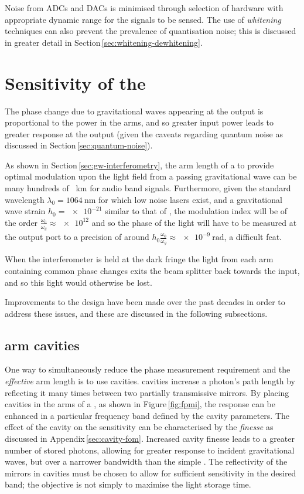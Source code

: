 Noise from \glspl{ADC} and \glspl{DAC} is minimised through selection of hardware with appropriate dynamic range for the signals to be sensed. The use of \emph{whitening} techniques can also prevent the prevalence of quantisation noise; this is discussed in greater detail in Section\,\ref{sec:whitening-dewhitening}.

\section{\label{sec:ifo-response}Sensitivity of the \MI{}}
The phase change due to gravitational waves appearing at the output is proportional to the power in the arms, and so greater input power leads to greater response at the output (given the caveats regarding quantum noise as discussed in Section\,\ref{sec:quantum-noise}).

As shown in Section\,\ref{sec:gw-interferometry}, the arm length of a \MI{} to provide optimal modulation upon the light field from a passing gravitational wave can be many hundreds of \SI{}{\kilo\meter} for audio band signals. Furthermore, given the standard wavelength $\lambda_0 = \SI{1064}{\nano\meter}$ for which low noise lasers exist, and a gravitational wave strain $h_0 = \num{e-21}$ similar to that of \GWFIRSTEVENT{}, the modulation index will be of the order $\frac{\omega_0}{\omega_g} \approx \num{e12}$ and so the phase of the light will have to be measured at the output port to a precision of around $h_0 \frac{\omega_0}{\omega_g} \approx \SI{e-9}{\radian}$, a difficult feat.

When the interferometer is held at the dark fringe the light from each arm containing common phase changes exits the beam splitter back towards the input, and so this light would otherwise be lost.

Improvements to the \MI{} design have been made over the past decades in order to address these issues, and these are discussed in the following subsections.

\subsection{\label{sec:fabry-perot-cavities}\FP{} arm cavities}
One way to simultaneously reduce the phase measurement requirement and the \emph{effective} arm length is to use \FP{} cavities. \FP{} cavities increase a photon's path length by reflecting it many times between two partially transmissive mirrors. By placing \FP{} cavities in the arms of a \MI{}, as shown in Figure\,\ref{fig:fpmi}, the response can be enhanced in a particular frequency band defined by the cavity parameters. The effect of the cavity on the sensitivity can be characterised by the \emph{finesse} as discussed in Appendix\,\ref{sec:cavity-fom}. Increased cavity finesse leads to a greater number of stored photons, allowing for greater response to incident gravitational waves, but over a narrower bandwidth than the simple \MI{}. The reflectivity of the mirrors in \FP{} cavities must be chosen to allow for sufficient sensitivity in the desired band; the objective is not simply to maximise the light storage time.


